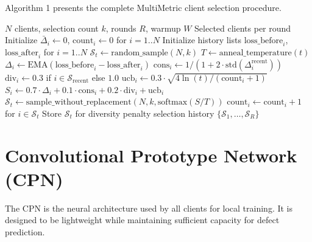 Algorithm 1 presents the complete MultiMetric client selection procedure.

\begin{algorithm}[htbp]
\caption{MultiMetric Client Selection}
\label{alg:multimetric}
\begin{algorithmic}[1]
\REQUIRE $N$ clients, selection count $k$, rounds $R$, warmup $W$
\ENSURE Selected clients per round
\STATE Initialize $\bar{\Delta}_i \gets 0$, $\text{count}_i \gets 0$ for $i=1..N$
\STATE Initialize history lists $\text{loss\_before}_i$, $\text{loss\_after}_i$ for $i=1..N$
        \STATE $\mathcal{S}_t \gets \text{random\_sample}(N, k)$ 
    \ELSE
        \STATE $T \gets \text{anneal\_temperature}(t)$
            \STATE $\Delta_i \gets \text{EMA}(\text{loss\_before}_i - \text{loss\_after}_i)$
            \STATE $\text{cons}_i \gets 1 / (1 + 2 \cdot \text{std}(\Delta_i^{\text{recent}}))$
            \STATE $\text{div}_i \gets 0.3$ if $i \in \mathcal{S}_{\text{recent}}$ else $1.0$
            \STATE $\text{ucb}_i \gets 0.3 \cdot \sqrt{4 \ln(t) / (\text{count}_i + 1)}$
            \STATE $S_i \gets 0.7 \cdot \Delta_i + 0.1 \cdot \text{cons}_i + 0.2 \cdot \text{div}_i + \text{ucb}_i$
        \ENDFOR
        \STATE $\mathcal{S}_t \gets \text{sample\_without\_replacement}(N, k, \text{softmax}(S/T))$
    \ENDIF
    \STATE $\text{count}_i \gets \text{count}_i + 1$ for $i \in \mathcal{S}_t$
    \STATE Store $\mathcal{S}_t$ for diversity penalty
\ENDFOR
\RETURN selection history $\{\mathcal{S}_1, \ldots, \mathcal{S}_R\}$
\end{algorithmic}
\end{algorithm}

\section{Convolutional Prototype Network (CPN)}

The CPN is the neural architecture used by all clients for local training. It is designed to be lightweight while maintaining sufficient capacity for defect prediction.


